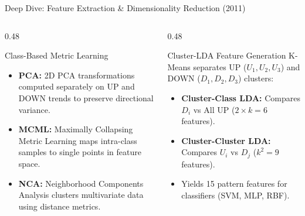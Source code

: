 \documentclass[aspectratio=169]{beamer}
\begin{document}
\begin{frame}{Deep Dive: Feature Extraction \& Dimensionality Reduction (2011)}
	
	\begin{columns}[T]
		\begin{column}{0.48\textwidth}
			\begin{block}{Class-Based Metric Learning}
				\begin{itemize}
					\item \textbf{PCA:} 2D PCA transformations computed separately on UP and DOWN trends to preserve directional variance.
					\item \textbf{MCML:} Maximally Collapsing Metric Learning maps intra-class samples to single points in feature space.
					\item \textbf{NCA:} Neighborhood Components Analysis clusters multivariate data using distance metrics.
				\end{itemize}
			\end{block}
		\end{column}
		\begin{column}{0.48\textwidth}
			\begin{block}{Cluster-LDA Feature Generation}
				K-Means separates UP ($U_1,U_2,U_3$) and DOWN ($D_1,D_2,D_3$) clusters:
				\begin{itemize}
					\item \textbf{Cluster-Class LDA:} Compares $D_i$ vs All UP ($2 \times k = 6$ features).
					\item \textbf{Cluster-Cluster LDA:} Compares $U_i$ vs $D_j$ ($k^2 = 9$ features).
					\item Yields 15 pattern features for classifiers (SVM, MLP, RBF).
				\end{itemize}
			\end{block}
		\end{column}
	\end{columns}
\end{frame}
\end{document}

